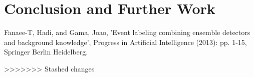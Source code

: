 \documentclass[12pt]{article}
\begin{document}
	
	\section{Conclusion and Further Work}
	\label{sec:conclusion}
	
	
	
	\begin{thebibliography}{9}
		Fanaee-T, Hadi, and Gama, Joao, 'Event labeling combining ensemble detectors and background knowledge', Progress in Artificial Intelligence (2013): pp. 1-15, Springer Berlin Heidelberg.
	\end{thebibliography}
	
>>>>>>> Stashed changes
\end{document}
